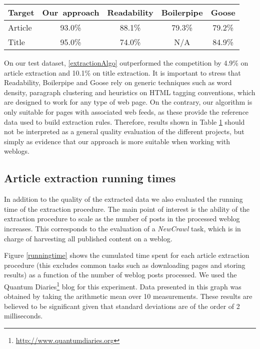 \begin{table}
{\begin{tabular}{@{}lcccc@{}} \toprule
		\textbf{Target} & \textbf{Our~approach} & \textbf{Readability} & \textbf{Boilerpipe} & \textbf{Goose} \\ \hline
    Article & 93.0\% & 88.1\% & 79.3\% & 79.2\% \\
    Title   & 95.0\% & 74.0\% & N/A    & 84.9\% \\ \hline
\end{tabular}}
\label{table:evaluation-performance}
\end{table}

On our test dataset, \autoref{extractionAlgo} outperformed the 
competition by 4.9\% on article extraction and 10.1\% on title 
extraction. It is important to stress that Readability, Boilerpipe 
and Goose rely on generic techniques such as word density, paragraph 
clustering and heuristics on HTML tagging conventions, which are designed 
to work for any type of web page. On the contrary, our algorithm is 
only suitable for pages with associated web feeds, as these provide the 
reference data used to build extraction rules. Therefore, results shown 
in Table \ref{table:evaluation-performance} should not be interpreted as a general 
quality evaluation of the different projects, but simply as evidence 
that our approach is more suitable when working with weblogs.

\subsection{Article extraction running times}

In addition to the quality of the extracted data we also evaluated the 
running time of the extraction procedure. The main point of interest is 
the ability of the extraction procedure to scale as the number of posts 
in the processed weblog increases. This corresponds to the evaluation of 
a \emph{NewCrawl} task, which is in charge of harvesting all published 
content on a weblog.

Figure \ref{runningtime} shows the cumulated time spent for each article 
extraction procedure (this excludes common tasks such as downloading 
pages and storing results) as a function of the number of weblog posts 
processed. We used the Quantum Diaries\footnote{\url{http://www.quantumdiaries.org}} 
blog for this experiment. Data presented in this graph was obtained
by taking the arithmetic mean over 10 measurements. These results are
believed to be significant given that standard deviations are of
the order of 2 milliseconds.


